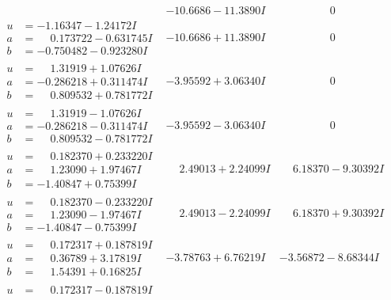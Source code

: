 \documentclass[1p]{elsarticle_modified}
\theoremstyle{definition}
\begin{document}
$$\begin{array}{c|c|c}
 & -10.6686 - 11.3890 I & \phantom{-0.000000 } 0 \\ \hline\begin{aligned}
u &= -1.16347 - 1.24172 I \\
a &= \phantom{-}0.173722 - 0.631745 I \\
b &= -0.750482 - 0.923280 I\end{aligned}
 & -10.6686 + 11.3890 I & \phantom{-0.000000 } 0 \\ \hline\begin{aligned}
u &= \phantom{-}1.31919 + 1.07626 I \\
a &= -0.286218 + 0.311474 I \\
b &= \phantom{-}0.809532 + 0.781772 I\end{aligned}
 & -3.95592 + 3.06340 I & \phantom{-0.000000 } 0 \\ \hline\begin{aligned}
u &= \phantom{-}1.31919 - 1.07626 I \\
a &= -0.286218 - 0.311474 I \\
b &= \phantom{-}0.809532 - 0.781772 I\end{aligned}
 & -3.95592 - 3.06340 I & \phantom{-0.000000 } 0 \\ \hline\begin{aligned}
u &= \phantom{-}0.182370 + 0.233220 I \\
a &= \phantom{-}1.23090 + 1.97467 I \\
b &= -1.40847 + 0.75399 I\end{aligned}
 & \phantom{-}2.49013 + 2.24099 I & \phantom{-}6.18370 - 9.30392 I \\ \hline\begin{aligned}
u &= \phantom{-}0.182370 - 0.233220 I \\
a &= \phantom{-}1.23090 - 1.97467 I \\
b &= -1.40847 - 0.75399 I\end{aligned}
 & \phantom{-}2.49013 - 2.24099 I & \phantom{-}6.18370 + 9.30392 I \\ \hline\begin{aligned}
u &= \phantom{-}0.172317 + 0.187819 I \\
a &= \phantom{-}0.36789 + 3.17819 I \\
b &= \phantom{-}1.54391 + 0.16825 I\end{aligned}
 & -3.78763 + 6.76219 I & -3.56872 - 8.68344 I \\ \hline\begin{aligned}
u &= \phantom{-}0.172317 - 0.187819 I \\

\end{aligned}
\end{array}$$
\end{document}
